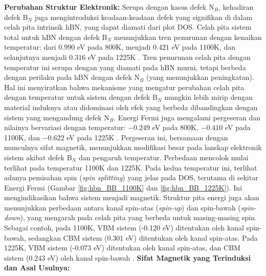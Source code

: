 \textbf{Perubahan Struktur Elektronik:}
Serupa dengan kasus defek N$_B$, kehadiran defek B$_N$ juga mengintroduksi keadaan-keadaan defek yang signifikan di dalam celah pita intrinsik hBN, yang dapat diamati dari plot DOS. Celah pita sistem total untuk hBN dengan defek B$_N$ menunjukkan tren penurunan dengan kenaikan temperatur: dari $0.990$ eV pada 800K, menjadi $0.421$ eV pada 1100K, dan selanjutnya menjadi $0.316$ eV pada 1225K . Tren penurunan celah pita dengan temperatur ini serupa dengan yang diamati pada hBN murni, tetapi berbeda dengan perilaku pada hBN dengan defek N$_B$ (yang menunjukkan peningkatan). Hal ini menyiratkan bahwa mekanisme yang mengatur perubahan celah pita dengan temperatur untuk sistem dengan defek B$_N$ mungkin lebih mirip dengan material induknya atau didominasi oleh efek yang berbeda dibandingkan dengan sistem yang mengandung defek N$_B$. Energi Fermi juga mengalami pergeseran dan nilainya bervariasi dengan temperatur: $-0.249$ eV pada 800K, $-0.410$ eV pada 1100K, dan $-0.622$ eV pada 1225K . Pergeseran ini, bersamaan dengan munculnya sifat magnetik, menunjukkan modifikasi besar pada lanskap elektronik sistem akibat defek B$_N$ dan pengaruh temperatur. Perbedaan mencolok mulai terlihat pada temperatur 1100K dan 1225K. Pada kedua temperatur ini, terlihat adanya pemisahan spin (\textit{spin splitting}) yang jelas pada DOS, terutama di sekitar Energi Fermi (Gambar \ref{fig:hbn_BB_1100K} dan \ref{fig:hbn_BB_1225K}). Ini mengindikasikan bahwa sistem menjadi magnetik. Struktur pita energi juga akan menunjukkan perbedaan antara kanal spin-atas (\textit{spin-up}) dan spin-bawah (\textit{spin-down}), yang mengarah pada celah pita yang berbeda untuk masing-masing spin. Sebagai contoh, pada 1100K, VBM sistem (-0.120 eV) ditentukan oleh kanal spin-bawah, sedangkan CBM sistem (0.301 eV) ditentukan oleh kanal spin-atas. Pada 1225K, VBM sistem (-0.073 eV) ditentukan oleh kanal spin-atas, dan CBM sistem (0.243 eV) oleh kanal spin-bawah . \textbf{Sifat Magnetik yang Terinduksi dan Asal Usulnya:}
